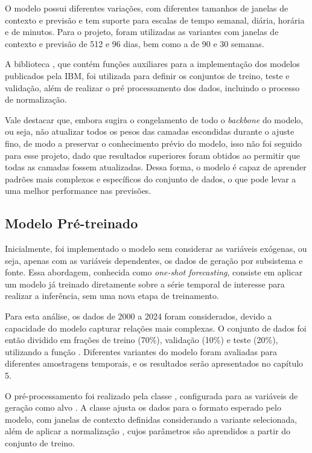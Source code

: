 O modelo possui diferentes variações, com diferentes tamanhos de janelas de contexto e previsão e tem suporte para escalas 
de tempo semanal, diária, horária e de minutos. Para o projeto, foram utilizadas as variantes com janelas de contexto e 
previsão de 512 e 96 dias, bem como a de 90 e 30 semanas.

A biblioteca , que contém funções auxiliares para a implementação dos modelos publicados pela IBM, foi
utilizada para definir os conjuntos de treino, teste e validação, além de realizar o pré processamento dos dados, incluindo o
processo de normalização.

Vale destacar que, embora  sugira o congelamento de todo o \textit{backbone} do modelo, ou seja, 
não atualizar todos os pesos das camadas escondidas durante o ajuste fino, de modo a preservar o conhecimento prévio do modelo,
isso não foi seguido para esse projeto, dado que resultados superiores foram obtidos ao permitir que todas as camadas 
fossem atualizadas. Dessa forma, o modelo é capaz de aprender padrões mais complexos e específicos do conjunto de dados, 
o que pode levar a uma melhor performance nas previsões.

\subsection{Modelo Pré-treinado} %
Inicialmente, foi implementado o modelo sem considerar as variáveis exógenas, ou seja, apenas com as variáveis dependentes, os 
dados de geração por subsistema e fonte. Essa abordagem, conhecida como \textit{one-shot forecasting}, consiste em aplicar 
um modelo já treinado diretamente sobre a série temporal de interesse para realizar a inferência, sem uma nova etapa de treinamento.

Para esta análise, os dados de 2000 a 2024 foram considerados, devido a capacidade do modelo capturar relações mais complexas. 
O conjunto de dados foi então dividido em frações de treino (70\%), validação (10\%) e teste (20\%), utilizando a função 
. Diferentes variantes do modelo foram avaliadas para diferentes amostragens temporais, e os resultados 
serão apresentados no capítulo 5.

O pré-processamento foi realizado pela classe , configurada para as variáveis de geração como 
alvo . A classe ajusta os dados para o formato esperado pelo modelo, com janelas de contexto definidas
considerando a variante selecionada, além de aplicar a normalização , cujos parâmetros são aprendidos 
a partir do conjunto de treino.

